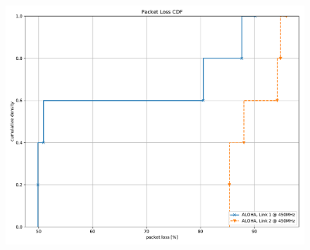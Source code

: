 \documentclass{article}
\begin{document}








\begin{figure}
	\includegraphics[width=\textwidth]{aloha_dual/cdf/packet_loss_cdf}
\end{figure}
\end{document}

